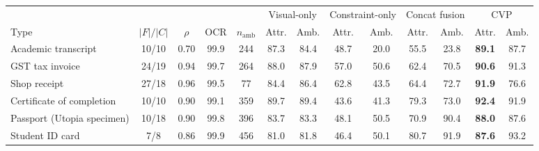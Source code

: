 \begin{tabular}{lcccccccccccc}
\toprule
 & & & & & \multicolumn{2}{c}{Visual-only} & \multicolumn{2}{c}{Constraint-only} & \multicolumn{2}{c}{Concat fusion} & \multicolumn{2}{c}{CVP}\\
Type & $|F|/|C|$ & $\rho$ & OCR & $n_{\mathrm{amb}}$ & Attr. & Amb. & Attr. & Amb. & Attr. & Amb. & Attr. & Amb.\\
\midrule
Academic transcript & 10/10 & 0.70 & 99.9 & 244 & 87.3 & 84.4 & 48.7 & 20.0 & 55.5 & 23.8 & \textbf{89.1} & 87.7\\
GST tax invoice & 24/19 & 0.94 & 99.7 & 264 & 88.0 & 87.9 & 57.0 & 50.6 & 62.4 & 70.5 & \textbf{90.6} & 91.3\\
Shop receipt & 27/18 & 0.96 & 99.5 & 77 & 84.4 & 86.4 & 62.8 & 43.5 & 64.4 & 72.7 & \textbf{91.9} & 76.6\\
Certificate of completion & 10/10 & 0.90 & 99.1 & 359 & 89.7 & 89.4 & 43.6 & 41.3 & 79.3 & 73.0 & \textbf{92.4} & 91.9\\
Passport (Utopia specimen) & 10/18 & 0.90 & 99.8 & 396 & 83.7 & 83.3 & 48.1 & 50.5 & 70.9 & 90.4 & \textbf{88.0} & 87.6\\
Student ID card & 7/8 & 0.86 & 99.9 & 456 & 81.0 & 81.8 & 46.4 & 50.1 & 80.7 & 91.9 & \textbf{87.6} & 93.2\\
\bottomrule
\end{tabular}
